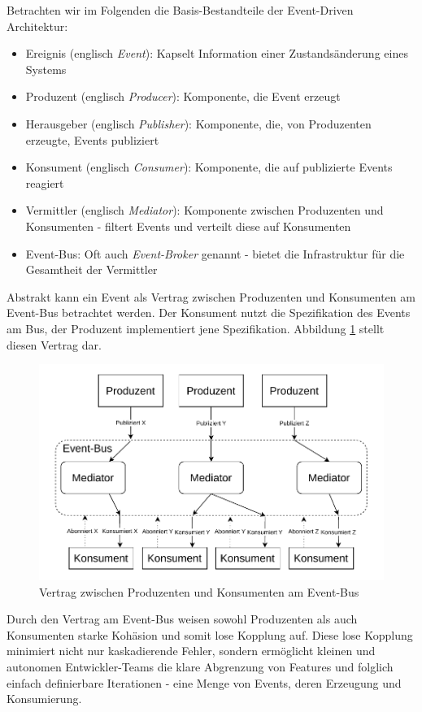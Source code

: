 \documentclass[acmtog]{acmart}
\begin{document}
Betrachten wir im Folgenden die Basis-Bestandteile der Event-Driven Architektur:
\begin{itemize}
  \item Ereignis (englisch \textit{Event}): Kapselt Information einer Zustandsänderung eines Systems
  \item Produzent (englisch \textit{Producer}): Komponente, die Event erzeugt
  \item Herausgeber (englisch \textit{Publisher}): Komponente, die, von Produzenten erzeugte, Events publiziert
  \item Konsument (englisch \textit{Consumer}): Komponente, die auf publizierte Events reagiert
  \item Vermittler (englisch \textit{Mediator}): Komponente zwischen Produzenten und Konsumenten - filtert Events und verteilt diese auf Konsumenten
  \item Event-Bus: Oft auch \textit{Event-Broker} genannt - bietet die Infrastruktur für die Gesamtheit der Vermittler
\end{itemize}
Abstrakt kann ein Event als Vertrag zwischen Produzenten und Konsumenten am Event-Bus betrachtet werden.
Der Konsument nutzt die Spezifikation des Events am Bus, der Produzent implementiert jene Spezifikation.
Abbildung \ref{fig:eda} stellt diesen Vertrag dar.

\begin{figure}[!h]
  \centering
  \includegraphics[width=\linewidth]{images/eda/eda.drawio}
  \caption{Vertrag zwischen Produzenten und Konsumenten am Event-Bus}
  \label{fig:eda}
\end{figure}

Durch den Vertrag am Event-Bus weisen sowohl Produzenten als auch Konsumenten starke Kohäsion und somit lose Kopplung auf.
Diese lose Kopplung minimiert nicht nur kaskadierende Fehler, sondern ermöglicht kleinen und autonomen Entwickler-Teams
die klare Abgrenzung von Features und folglich einfach definierbare Iterationen - eine Menge von Events, deren Erzeugung und Konsumierung.
\end{document}
